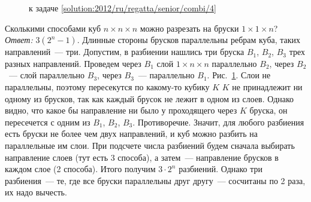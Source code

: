 \ifsolution
\begin{figure}\centering
    \caption{к задаче \ref{solution:2012/ru/regatta/senior/combi/4}}
    \label{fig:solution:2012/ru/regatta/senior/combi/4}
\end{figure}
\fi %

\problem
Сколькими способами куб $n \times n \times n$ можно разрезать на бруски
$1 \times 1 \times n$?
\solution
\label{solution:2012/ru/regatta/senior/combi/4}%
\emph{Ответ:} $3(2^n - 1)$.
Длинные стороны брусков параллельны ребрам куба, таких направлений~--- три.
Допустим, в разбиении нашлись три бруска $B_1$, $B_2$, $B_3$ трех разных
направлений.
Проведем через $B_1$ слой $1 \times n \times n$ параллельно $B_2$,
через $B_2$~--- слой параллельно $B_3$, через $B_3$~--- параллельно $B_1$.
Рис.~\ref{fig:solution:2012/ru/regatta/senior/combi/4}.
Слои не параллельны, поэтому пересекутся по какому-то кубику $K$
$K$ не принадлежит ни одному из брусков, так как каждый брусок не лежит в
одном из слоев.
Однако видно, что какое бы направление ни было у проходящего через $K$ бруска,
он пересечется с одним из $B_1$, $B_2$, $B_3$.
Противоречие.
Значит, для любого разбиения есть бруски не более чем двух направлений, и куб
можно разбить на параллельные им слои.
При подсчете числа разбиений будем сначала выбирать направление слоев
(тут есть 3 способа), а затем~--- направление брусков в каждом слое
(2 способа).
Итого получим $3 \cdot 2^n$ разбиений.
Однако три разбиения~--- те, где все бруски параллельны друг другу~---
сосчитаны по 2 раза, их надо вычесть.
\endproblem
